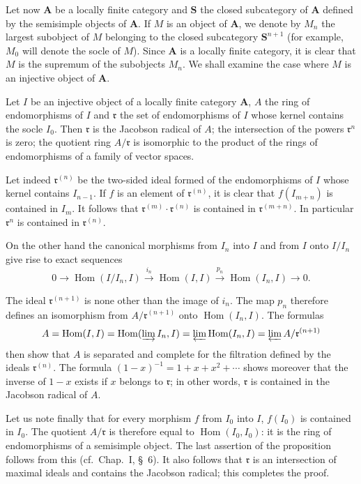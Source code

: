 Let now $\mathbf{A}$ be a locally finite category and $\mathbf{S}$ the
closed subcategory of $\mathbf{A}$ defined by the semisimple objects of
$\mathbf{A}$. If $M$ is an object of $\mathbf{A}$, we denote by $M_n$
the largest subobject of $M$ belonging to the closed subcategory
$\mathbf{S}^{n+1}$ (for example, $M_0$ will denote the socle of $M$).
Since $\mathbf{A}$ is a locally finite category, it is clear that $M$
is the supremum of the subobjects $M_n$. We shall examine the case
where $M$ is an injective object of $\mathbf{A}$.

\begin{proposition}
Let $I$ be an injective object of a locally finite category
$\mathbf{A}$, $A$ the ring of endomorphisms of $I$ and $\mathfrak{r}$
the set of endomorphisms of $I$ whose kernel contains the socle $I_0$.
Then $\mathfrak{r}$ is the Jacobson radical of $A$; the intersection of
the powers $\mathfrak{r}^n$ is zero; the quotient ring
$A/\mathfrak{r}$ is isomorphic to the product of the rings of
endomorphisms of a family of vector spaces.
\end{proposition}

Let indeed $\mathfrak{r}^{(n)}$ be the two-sided ideal formed of the
endomorphisms of $I$ whose kernel contains $I_{n-1}$. If $f$ is an
element of $\mathfrak{r}^{(n)}$, it is clear that $f(I_{m+n})$ is
contained in $I_m$. It follows that
$\mathfrak{r}^{(m)}\cdot\mathfrak{r}^{(n)}$ is contained in
$\mathfrak{r}^{(m+n)}$. In particular $\mathfrak{r}^n$ is contained in
$\mathfrak{r}^{(n)}$.

On the other hand the canonical morphisms from $I_n$ into $I$ and from
$I$ onto $I/I_n$ give rise to exact sequences
\[
0\to\operatorname{Hom}(I/I_n,I)\xrightarrow{i_n}\operatorname{Hom}(I,I)\xrightarrow{p_n}\operatorname{Hom}(I_n,I)\to0.
\]

The ideal $\mathfrak{r}^{(n+1)}$ is none other than the image of $i_n$.
The map $p_n$ therefore defines an isomorphism from
$A/\mathfrak{r}^{(n+1)}$ onto $\operatorname{Hom}(I_n,I)$. The formulas
\[
A=\operatorname{Hom}(I,I)=\operatorname{Hom}(\varinjlim I_n,I)=\varprojlim\operatorname{Hom}(I_n,I)=\varprojlim A/\mathfrak{r}^{(n+1)}
\]
then show that $A$ is separated and complete for the filtration defined
by the ideals $\mathfrak{r}^{(n)}$. The formula
$(1-x)^{-1}=1+x+x^2+\cdots$ shows moreover that the inverse of $1-x$
exists if $x$ belongs to $\mathfrak{r}$; in other words,
$\mathfrak{r}$ is contained in the Jacobson radical of $A$.

Let us note finally that for every morphism $f$ from $I_0$ into $I$,
$f(I_0)$ is contained in $I_0$. The quotient $A/\mathfrak{r}$ is
therefore equal to $\operatorname{Hom}(I_0,I_0)$: it is the ring of
endomorphisms of a semisimple object. The last assertion of the
proposition follows from this (cf.\ Chap.~I, \S~6). It also follows
that $\mathfrak{r}$ is an intersection of maximal ideals and contains
the Jacobson radical; this completes the proof.

